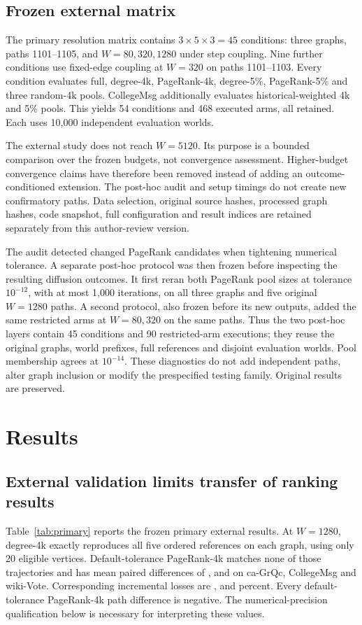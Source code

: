 \documentclass[smallextended]{svjour3}
\begin{document}
\subsection{Frozen external matrix}
The primary resolution matrix contains $3\times5\times3=45$ conditions: three graphs, paths 1101--1105, and $W=80,320,1280$ under step coupling. Nine further conditions use fixed-edge coupling at $W=320$ on paths 1101--1103. Every condition evaluates full, degree-4k, PageRank-4k, degree-5\%, PageRank-5\% and three random-4k pools. CollegeMsg additionally evaluates historical-weighted 4k and 5\% pools. This yields 54 conditions and 468 executed arms, all retained. Each uses 10,000 independent evaluation worlds.

The external study does not reach $W=5120$. Its purpose is a bounded comparison over the frozen budgets, not convergence assessment. Higher-budget convergence claims have therefore been removed instead of adding an outcome-conditioned extension. The post-hoc audit and setup timings do not create new confirmatory paths. Data selection, original source hashes, processed graph hashes, code snapshot, full configuration and result indices are retained separately from this author-review version.

The audit detected changed PageRank candidates when tightening numerical tolerance. A separate post-hoc protocol was then frozen before inspecting the resulting diffusion outcomes. It first reran both PageRank pool sizes at tolerance $10^{-12}$, with at most 1,000 iterations, on all three graphs and five original $W=1280$ paths. A second protocol, also frozen before its new outputs, added the same restricted arms at $W=80,320$ on the same paths. Thus the two post-hoc layers contain 45 conditions and 90 restricted-arm executions; they reuse the original graphs, world prefixes, full references and disjoint evaluation worlds. Pool membership agrees at $10^{-14}$. These diagnostics do not add independent paths, alter graph inclusion or modify the prespecified testing family. Original results are preserved.

\section{Results}
\subsection{External validation limits transfer of ranking results}
Table~\ref{tab:primary} reports the frozen primary external results. At $W=1280$, degree-4k exactly reproduces all five ordered references on each graph, using only 20 eligible vertices. Default-tolerance PageRank-4k matches none of those trajectories and has mean paired differences of \GrqcPRDelta{}, \CollegePRDelta{} and \WikiPRDelta{} on ca-GrQc, CollegeMsg and wiki-Vote. Corresponding incremental losses are \GrqcPRLoss{}, \CollegePRLoss{} and \WikiPRLoss{} percent. Every default-tolerance PageRank-4k path difference is negative. The numerical-precision qualification below is necessary for interpreting these values.

\end{document}
